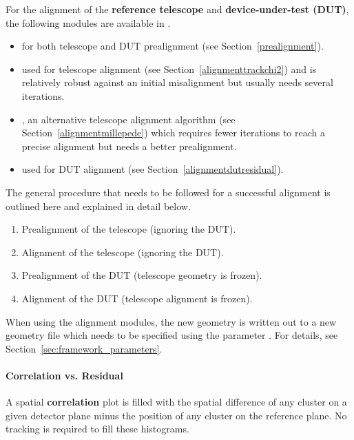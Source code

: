 For the alignment of the \textbf{reference telescope} and \textbf{device-under-test (DUT)}, the following modules are available in \corry.
\begin{itemize}
\item {} for both telescope and DUT prealignment (see Section~\ref{prealignment}).
\item {} used for telescope alignment (see Section~\ref{alignmenttrackchi2}) and is relatively robust against an initial misalignment but usually needs several iterations.
\item {}, an alternative telescope alignment algorithm (see Section~\ref{alignmentmillepede}) which requires fewer iterations to reach a precise alignment but needs a better prealignment.
\item {} used for DUT alignment (see Section~\ref{alignmentdutresidual}).
\end{itemize}

The general procedure that needs to be followed for a successful alignment is outlined here and explained in detail below.
\begin{enumerate}
\item Prealignment of the telescope (ignoring the DUT).
\item Alignment of the telescope (ignoring the DUT).
\item Prealignment of the DUT (telescope geometry is frozen).
\item Alignment of the DUT (telescope alignment is frozen).
\end{enumerate}

\begin{warning}
When using the alignment modules, the new geometry is written out to a new geometry file which needs to be specified using the parameter .
For details, see Section~\ref{sec:framework_parameters}.
\end{warning}

\paragraph{Correlation vs. Residual}

A spatial \textbf{correlation} plot is filled with the spatial difference of any cluster on a given detector plane minus the position of any cluster on the reference plane. No tracking is required to fill these histograms.

